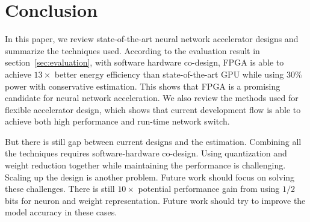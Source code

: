 \section{Conclusion}\label{sec:conclusion}

In this paper, we review state-of-the-art neural network accelerator designs and summarize the techniques used. According to the evaluation result in section~\ref{sec:evaluation}, with software hardware co-design, FPGA is able to achieve $13\times$ better energy efficiency than state-of-the-art GPU while using $30\%$ power with conservative estimation. This shows that FPGA is a promising candidate for neural network acceleration. We also review the methods used for flexible accelerator design, which shows that current development flow is able to achieve both high performance and run-time network switch.

But there is still gap between current designs and the estimation. Combining all the techniques requires software-hardware co-design. Using quantization and weight reduction together while maintaining the performance is challenging. Scaling up the design is another problem. Future work should focus on solving these challenges. There is still $10\times$ potential performance gain from using $1/2$ bits for neuron and weight representation. Future work should try to improve the model accuracy in these cases.